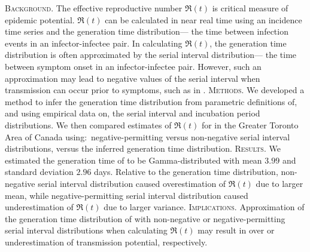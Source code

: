 \textsc{Background}.
The effective reproductive number $\Re(t)$
is critical measure of epidemic potential.
$\Re(t)$ can be calculated in near real time
using an incidence time series and the generation time distribution---%
the time between infection events in an infector-infectee pair.
In calculating $\Re(t)$, the generation time distribution
is often approximated by the serial interval distribution---%
the time between symptom onset in an infector-infectee pair.
However, such an approximation may lead to
negative values of the serial interval when transmission can 
occur prior to symptoms, such as in \covid.
\textsc{Methods}.
We developed a method to infer the generation time distribution
from parametric definitions of, and using empirical data on,
the serial interval and incubation period distributions.
We then compared estimates of $\Re(t)$ for \covid in
the Greater Toronto Area of Canada using:\
negative-permitting versus non-negative serial interval distributions,
versus the inferred generation time distribution.
\textsc{Results}.
We estimated the generation time of \covid to be
Gamma-distributed with mean $3.99$ and standard deviation $2.96$ days.
Relative to the generation time distribution,
non-negative serial interval distribution caused overestimation of $\Re(t)$
due to larger mean, while
negative-permitting serial interval distribution caused underestimation of $\Re(t)$
due to larger variance.
\textsc{Implications}.
Approximation of the generation time distribution of \covid
with non-negative or negative-permitting serial interval distributions
when calculating $\Re(t)$ may result in over or underestimation of
transmission potential, respectively.
